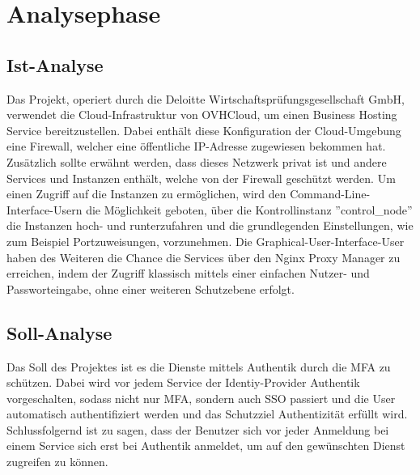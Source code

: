 \section{Analysephase} 
\label{sec:Analysephase}


\subsection{Ist-Analyse} 
\label{sec:IstAnalyse}
Das Projekt, operiert durch die Deloitte Wirtschaftsprüfungsgesellschaft GmbH, verwendet die Cloud-Infrastruktur 
von OVHCloud, um einen Business Hosting Service bereitzustellen. Dabei enthält diese Konfiguration der 
Cloud-Umgebung eine Firewall, welcher eine öffentliche IP-Adresse zugewiesen bekommen hat. Zusätzlich sollte erwähnt werden, 
dass dieses Netzwerk privat ist und andere Services und Instanzen enthält, welche von der Firewall geschützt werden.
Um einen Zugriff auf die Instanzen zu ermöglichen, wird den Command-Line-Interface-Usern die Möglichkeit geboten, 
über die Kontrollinstanz ''control\_node'' die Instanzen hoch- und runterzufahren und die grundlegenden Einstellungen, wie 
zum Beispiel Portzuweisungen, vorzunehmen. Die Graphical-User-Interface-User haben des Weiteren die Chance die Services über 
den Nginx Proxy Manager zu erreichen, indem der Zugriff klassisch mittels einer einfachen Nutzer- und Passworteingabe, 
ohne einer weiteren Schutzebene erfolgt.

\subsection{Soll-Analyse}
\label{sec:SollAnalyse}
Das Soll des Projektes ist es die Dienste mittels Authentik durch die MFA zu schützen. Dabei wird vor jedem Service 
der Identiy-Provider Authentik vorgeschalten, sodass nicht nur MFA, sondern auch SSO passiert und die User automatisch 
authentifiziert werden und das Schutzziel Authentizität erfüllt wird.
\\Schlussfolgernd ist zu sagen, dass der Benutzer sich vor jeder Anmeldung bei einem Service sich erst bei Authentik 
anmeldet, um auf den gewünschten Dienst zugreifen zu können.



